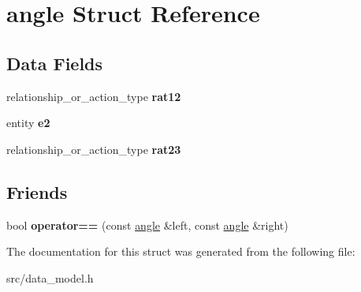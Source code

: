 \hypertarget{structangle}{}\section{angle Struct Reference}
\label{structangle}
\subsection*{Data Fields}
\begin{DoxyCompactItemize}
\item 
\mbox{\label{structangle_ae2506f4585814e8db2472cc9665bc230}} 
relationship\+\_\+or\+\_\+action\+\_\+type {\bfseries rat12}
\item 
\mbox{\label{structangle_a8be7ceadded85927d37e07a37f73e126}} 
entity {\bfseries e2}
\item 
\mbox{\label{structangle_a718f64e8c5e13b0d0a3be99a034b87fe}} 
relationship\+\_\+or\+\_\+action\+\_\+type {\bfseries rat23}
\end{DoxyCompactItemize}
\subsection*{Friends}
\begin{DoxyCompactItemize}
\item 
\mbox{\label{structangle_a08af3ce953cf2a9246fc60278c929a52}} 
bool {\bfseries operator==} (const \hyperlink{structangle}{angle} \&left, const \hyperlink{structangle}{angle} \&right)
\end{DoxyCompactItemize}


The documentation for this struct was generated from the following file\+:\begin{DoxyCompactItemize}
\item 
src/data\+\_\+model.\+h\end{DoxyCompactItemize}
